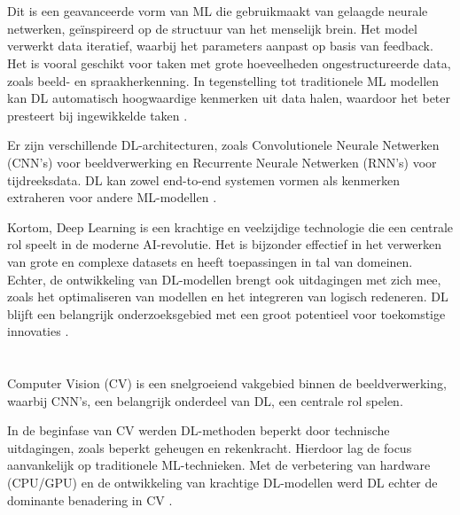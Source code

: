 \section{}%
\label{sec:deep-learning}

Dit is een geavanceerde vorm van ML die gebruikmaakt van gelaagde neurale netwerken, geïnspireerd op de structuur van het menselijk brein.
Het model verwerkt data iteratief, waarbij het parameters aanpast op basis van feedback.  
Het is vooral geschikt voor taken met grote hoeveelheden ongestructureerde data, zoals beeld- en spraakherkenning. 
In tegenstelling tot traditionele ML modellen kan DL automatisch hoogwaardige kenmerken uit data halen, waardoor het beter presteert bij ingewikkelde taken \autocite{SharifaniEtAl2023}.

Er zijn verschillende DL-architecturen, zoals Convolutionele Neurale Netwerken (CNN's) voor beeldverwerking en Recurrente Neurale Netwerken (RNN's) voor tijdreeksdata. 
DL kan zowel end-to-end systemen vormen als kenmerken extraheren voor andere ML-modellen \autocite{JanieschEtAl2021}. 

Kortom, Deep Learning is een krachtige en veelzijdige technologie die een centrale rol speelt in de moderne AI-revolutie. 
Het is bijzonder effectief in het verwerken van grote en complexe datasets en heeft toepassingen in tal van domeinen. 
Echter, de ontwikkeling van DL-modellen brengt ook uitdagingen met zich mee, zoals het optimaliseren van modellen en het integreren van logisch redeneren. 
DL blijft een belangrijk onderzoeksgebied met een groot potentieel voor toekomstige innovaties \autocite{JiangEtAl2022}.

\section{}%
\label{sec:computer-vision}

Computer Vision (CV) is een snelgroeiend vakgebied binnen de beeldverwerking, waarbij CNN's, een belangrijk onderdeel van DL, een centrale rol spelen.  

In de beginfase van CV werden DL-methoden beperkt door technische uitdagingen, zoals beperkt geheugen en rekenkracht. 
Hierdoor lag de focus aanvankelijk op traditionele ML-technieken. 
Met de verbetering van hardware (CPU/GPU) en de ontwikkeling van krachtige DL-modellen werd DL echter de dominante benadering in CV \autocite{ChaiEtAl2021}.

